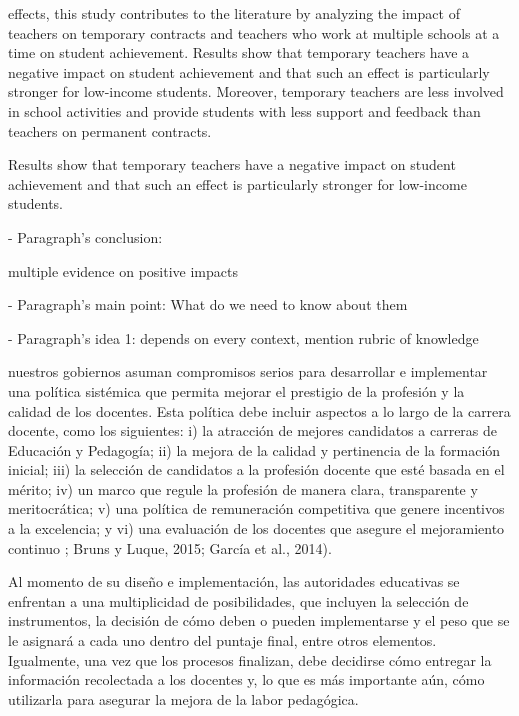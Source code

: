 effects, this study contributes to the literature by analyzing the impact of teachers on temporary contracts and teachers who work at multiple schools at a time on student achievement. Results show that temporary teachers have a negative impact on student achievement and that such an effect is particularly stronger for low-income students. Moreover, temporary teachers are less involved in school activities and provide students with less support and feedback than teachers on permanent contracts. \citep{Duflo_et_al_2009}


Results show that temporary teachers have a negative impact on student achievement and that such an effect is particularly stronger for low-income students. \citep{Marotta_2019}


- Paragraph's conclusion: 

multiple evidence on positive impacts






- Paragraph's main point: What do we need to know about them

- Paragraph's idea 1: depends on every context, mention rubric of knowledge


nuestros gobiernos asuman compromisos serios para desarrollar e implementar una política sistémica que permita mejorar el prestigio de la profesión y la calidad de los docentes. Esta política debe incluir aspectos a lo largo de la carrera docente, como los siguientes: i) la atracción de mejores candidatos a carreras de Educación y Pedagogía; ii) la mejora de la calidad y pertinencia de la formación inicial; iii) la selección de candidatos a la profesión docente que esté basada en el mérito; iv) un marco que regule la profesión de manera clara, transparente y meritocrática; v) una política de remuneración competitiva que genere incentivos a la excelencia; y vi) una evaluación de los docentes que asegure el mejoramiento continuo \citep{Elacqua_et_al_2018}; Bruns y Luque, 2015; García et al., 2014).

Al momento de su diseño e implementación, las autoridades educativas se enfrentan a una multiplicidad de posibilidades, que incluyen la selección de instrumentos, la decisión de cómo deben o pueden implementarse y el peso que se le asignará a cada uno dentro del puntaje final, entre otros elementos. Igualmente, una vez que los procesos finalizan, debe decidirse cómo entregar la información recolectada a los docentes y, lo que es más importante aún, cómo utilizarla para asegurar la mejora de la labor pedagógica. 

